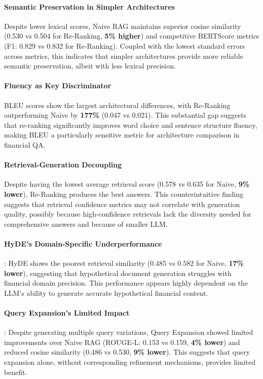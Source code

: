 \documentclass[11pt]{article}
\begin{document}
\paragraph{Semantic Preservation in Simpler Architectures} Despite lower 
lexical scores, Naive RAG maintains superior cosine similarity (0.530 vs 
0.504 for Re-Ranking, \textbf{5\% higher}) and competitive BERTScore metrics 
(F1: 0.829 vs 0.832 for Re-Ranking). Coupled with the lowest standard errors 
across metrics, this indicates that simpler architectures provide more 
reliable semantic preservation, albeit with less lexical precision.

\paragraph{Fluency as Key Discriminator} BLEU scores show the largest 
architectural differences, with Re-Ranking outperforming Naive by 
\textbf{177\%} (0.047 vs 0.021). This substantial gap suggests that 
re-ranking significantly improves word choice and sentence structure 
fluency, making BLEU a particularly sensitive metric for architecture 
comparison in financial QA.

\paragraph{Retrieval-Generation Decoupling} Despite having the lowest 
average retrieval score (0.578 vs 0.635 for Naive, \textbf{9\% lower}), 
Re-Ranking produces the best answers. This counterintuitive finding 
suggests that retrieval confidence metrics may not correlate with 
generation quality, possibly because high-confidence retrievals lack 
the diversity needed for comprehensive answers and because of smaller LLM.

\paragraph{HyDE's Domain-Specific Underperformance}: HyDE shows 
the poorest retrieval similarity (0.485 vs 0.582 for Naive, 
\textbf{17\% lower}), suggesting that hypothetical document generation 
struggles with financial domain precision. This performance appears 
highly dependent on the LLM's ability to generate accurate hypothetical 
financial content.

\paragraph{Query Expansion's Limited Impact}: Despite generating 
multiple query variations, Query Expansion showed limited improvements over 
Naive RAG (ROUGE-L: 0.153 vs 0.159, \textbf{4\% lower}) and reduced cosine 
similarity (0.486 vs 0.530, \textbf{9\% lower}). This suggests that query 
expansion alone, without corresponding refinement mechanisms, provides 
limited benefit.
\end{document}
